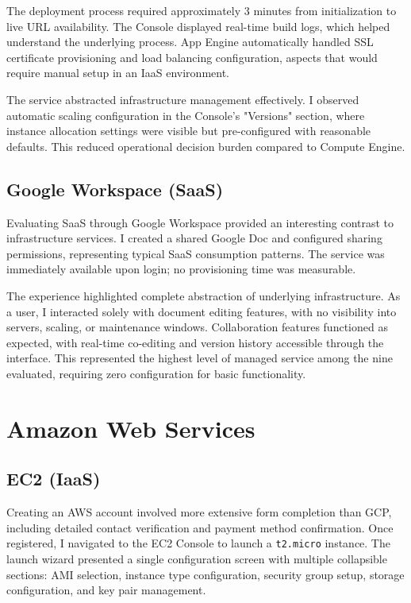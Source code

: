 \documentclass[11pt,a4paper]{article}
\begin{document}
The deployment process required approximately 3 minutes from initialization to live URL availability. The Console displayed real-time build logs, which helped understand the underlying process. App Engine automatically handled SSL certificate provisioning and load balancing configuration, aspects that would require manual setup in an IaaS environment.

The service abstracted infrastructure management effectively. I observed automatic scaling configuration in the Console's "Versions" section, where instance allocation settings were visible but pre-configured with reasonable defaults. This reduced operational decision burden compared to Compute Engine.

\subsection{Google Workspace (SaaS)}
Evaluating SaaS through Google Workspace provided an interesting contrast to infrastructure services. I created a shared Google Doc and configured sharing permissions, representing typical SaaS consumption patterns. The service was immediately available upon login; no provisioning time was measurable.

The experience highlighted complete abstraction of underlying infrastructure. As a user, I interacted solely with document editing features, with no visibility into servers, scaling, or maintenance windows. Collaboration features functioned as expected, with real-time co-editing and version history accessible through the interface. This represented the highest level of managed service among the nine evaluated, requiring zero configuration for basic functionality.

\section{Amazon Web Services}

\subsection{EC2 (IaaS)}
Creating an AWS account involved more extensive form completion than GCP, including detailed contact verification and payment method confirmation. Once registered, I navigated to the EC2 Console to launch a \texttt{t2.micro} instance. The launch wizard presented a single configuration screen with multiple collapsible sections: AMI selection, instance type configuration, security group setup, storage configuration, and key pair management.
\end{document}
